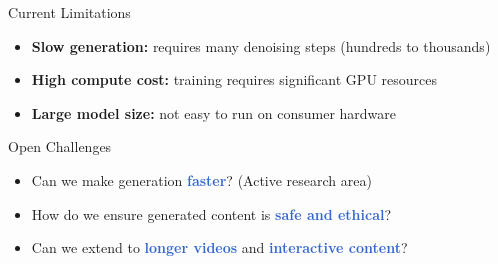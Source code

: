 \documentclass[handout, aspectratio=169,11pt]{beamer}
\newcommand{\emphasisword}[2]{\textcolor{#1}{\textbf{#2}}}
\newcommand{\highlight}[1]{\emphasisword{Highlight}{#1}}
\newcommand{\important}[1]{\emphasisword{Highlight}{#1}}
\begin{document}


\begin{frame}{Current Limitations}
        \begin{itemize}
          \item \textbf{Slow generation:} requires many denoising steps
                (hundreds to thousands)
                \pause
          \item \textbf{High compute cost:} training requires significant
                GPU resources
                \pause
          \item \textbf{Large model size:} not easy to run on consumer hardware
        \end{itemize}
\end{frame}
\begin{frame}{Open Challenges}
        \begin{itemize}
          \item Can we make generation \highlight{faster}?
                (Active research area)
                \pause
          \item How do we ensure generated content is \important{safe and ethical}?
          \pause
          \item Can we extend to \highlight{longer videos} and
                \highlight{interactive content}?
        \end{itemize}
\end{frame}
\end{document}
